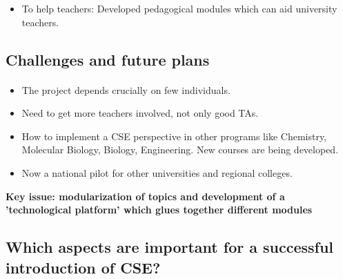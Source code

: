 \documentclass[%
twoside,                 %
final,                   %
10pt]{article}
\begin{document}
\begin{itemize}
\item To help teachers: Developed pedagogical modules which can aid university teachers.
\end{itemize}

\noindent



\subsection*{Challenges and future plans}

\paragraph{}

\begin{itemize}
\item The project depends crucially on few individuals. 

\item Need to get more teachers involved, not only good TAs.

\item How  to implement a CSE perspective in other programs like Chemistry, Molecular Biology,  Biology, Engineering. New courses are being developed.

\item Now a national pilot for other universities and regional colleges.
\end{itemize}

\noindent
\textbf{Key issue: modularization of topics and development of a 'technological platform' which glues together different modules}



\subsection*{Which aspects are important for a successful introduction of CSE?}

\paragraph{}
\end{document}
